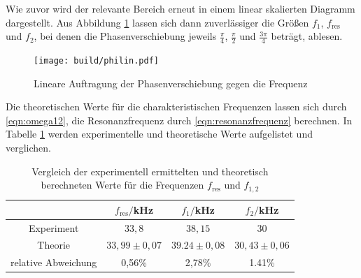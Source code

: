 Wie zuvor wird der relevante Bereich erneut in einem linear skalierten Diagramm
dargestellt. Aus Abbildung \ref{fig:philin} lassen sich dann zuverlässiger die Größen
$f_1$, $f_\text{res}$ und $f_2$, bei denen die Phasenverschiebung jeweils $\frac{\pi}{4}$,
$\frac{\pi}{2}$ und $\frac{3\pi}{4}$ beträgt, ablesen.

\begin{figure}
  \centering
  \texttt{[image: build/philin.pdf]}
  \caption{Lineare Auftragung der Phasenverschiebung gegen die Frequenz}
  \label{fig:philin}
\end{figure}

Die theoretischen Werte für die charakteristischen Frequenzen lassen sich durch
\eqref{eqn:omega12}, die Resonanzfrequenz durch \eqref{eqn:resonanzfrequenz} berechnen. In Tabelle \ref{tab:frequenzvergleich} werden experimentelle und theoretische
Werte aufgelistet und verglichen.
\begin{table}
\centering
\begin{tabular}{cccc}
\toprule
& $f_\mathrm{res}/$kHz & $f_1/$kHz & $f_2/$kHz \\
\midrule
Experiment & $33,8$ & $38,15$ & $30$\\
Theorie & $33,99 \pm 0,07 $ & $ 39.24 \pm 0,08$ & $30,43 \pm 0,06$ \\
\hline
relative Abweichung & 0,56\% & 2,78\% & 1.41\%\\
\bottomrule
\end{tabular}
\caption{Vergleich der experimentell ermittelten und theoretisch berechneten Werte für die Frequenzen $f_\mathrm{res}$ und $f_{1,2}$}
\label{tab:frequenzvergleich}
\end{table}
